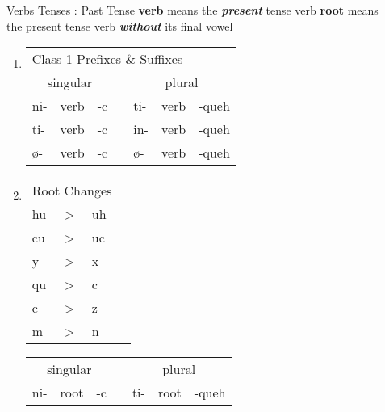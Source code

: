 \documentclass[12pt]{beamer}
\newcommand{\nah}[1]{\textcolor{nahgrn}{#1}}
\newcommand{\trs}[1]{\textcolor{nahblu}{#1}}
\begin{document}
\begin{frame}
\begin{columns}[t]
\begin{column}{.26\linewidth}
		\end{column}
		\begin{column}{.20\linewidth}
			\begin{block}{Verbs Tenses : Past Tense}
				\textbf{verb} means the \textbf{\textit{present}} tense verb \newline
				\textbf{root} means the present tense verb \textbf{\textit{without}} its final vowel \newline
				\begin{enumerate}
					\item \begin{tabular}[t]{lllllll}
						\multicolumn{7}{l}{Class 1 \nah{Prefixes} \& \trs{Suffixes}}       	         \\
						\multicolumn{3}{c}{singular}    & \vline & \multicolumn{3}{c}{plural}        \\
						\cline{1-7}
						\nah{ni-}   & verb & \trs{-c}   & \vline & \nah{ti-}   & verb & \trs{-queh}  \\
						\nah{ti-}   & verb & \trs{-c}   & \vline & \nah{in-}   & verb & \trs{-queh}  \\
						\nah{ø-}    & verb & \trs{-c}   & \vline & \nah{ø-}    & verb & \trs{-queh}  \\
					\end{tabular}%
					\item \text{Class 2 \nah{Prefixes} \& \trs{Suffixes}}
					\newline
					\begin{tabular}[t]{llll}
						\multicolumn{3}{c}{Root Changes} & \vline \\
						\cline{1-3}
						hu & > & uh & \vline	\\
						cu & > & uc & \vline	\\
						y & > & x 	& \vline	\\
						qu & > & c 	& \vline 	\\
						c & > & z 	& \vline 	\\
						m & > & n 	& \vline 	\\
					\end{tabular}%
					\begin{tabular}[t]{lllllll}
						\multicolumn{3}{c}{singular}    & \vline & \multicolumn{3}{c}{plural}        \\
						\cline{1-7}
						\nah{ni-}   & root & \trs{-c}   & \vline & \nah{ti-}   & root & \trs{-queh}  \\

\end{tabular}
\end{enumerate}
\end{block}
\end{column}
\end{columns}
\end{frame}
\end{document}
